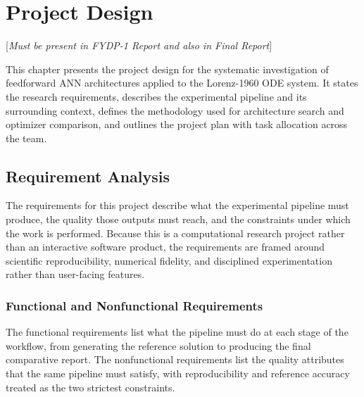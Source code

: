 \chapter{Project Design}

[\textit{Must be present in FYDP-1 Report and also in Final Report}]

This chapter presents the project design for the systematic investigation of feedforward ANN architectures applied to the Lorenz-1960 ODE system. It states the research requirements, describes the experimental pipeline and its surrounding context, defines the methodology used for architecture search and optimizer comparison, and outlines the project plan with task allocation across the team.

\section{Requirement Analysis}

The requirements for this project describe what the experimental pipeline must produce, the quality those outputs must reach, and the constraints under which the work is performed. Because this is a computational research project rather than an interactive software product, the requirements are framed around scientific reproducibility, numerical fidelity, and disciplined experimentation rather than user-facing features.

\subsection{Functional and Nonfunctional Requirements}

The functional requirements list what the pipeline must do at each stage of the workflow, from generating the reference solution to producing the final comparative report. The nonfunctional requirements list the quality attributes that the same pipeline must satisfy, with reproducibility and reference accuracy treated as the two strictest constraints.

